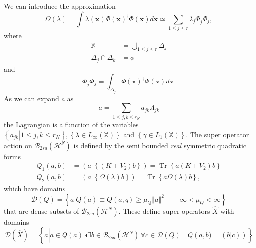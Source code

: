 \documentclass[aps,preprint]{revtex4}%
\begin{document}
We can introduce the approximation
\begin{equation}
\Omega\left(  \lambda\right)  =\int\lambda\left(  \mathbf{x}\right)
\Phi\left(  \mathbf{x}\right)  ^{\dagger}\Phi\left(  \mathbf{x}\right)
d\mathbf{x\simeq}\sum_{1\leq j\leq r}\lambda_{j}\Phi_{j}^{\dagger}\Phi_{j},
\end{equation}
where
\begin{align}
\mathbb{X}  &  \mathbb{=}\bigcup\limits_{1\leq j\leq r}\mathbb{\Delta}_{j}\\
\mathbb{\Delta}_{j}\cap\mathbb{\Delta}_{k}  &  =\phi
\end{align}
and
\begin{equation}
\Phi_{j}^{\dagger}\Phi_{j}=\int_{\mathbb{\Delta}_{j}}\Phi\left(
\mathbf{x}\right)  ^{\dagger}\Phi\left(  \mathbf{x}\right)  d\mathbf{x.}%
\end{equation}
As we can expand $a$ as
\begin{equation}
a=\sum_{1\leq j,k\leq r_{N}}a_{jk}\Lambda_{jk}%
\end{equation}
the Lagrangian is a function of the variables $\left\{  \left.  a_{jk}%
\right\vert 1\leq j,k\leq r_{N}\right\}  ,\left\{  \lambda\in L_{\infty
}\left(  \mathbb{X}\right)  \right\}  $ and $\left\{  \gamma\in L_{1}\left(
\mathbb{X}\right)  \right\}  .$ The super operator action on $\mathcal{B}%
_{2sa}\left(  \mathcal{H}^{N}\right)  $ is defined by the semi bounded
\emph{real }symmetric quadratic forms
\begin{align}
Q_{1}\left(  a,b\right)   &  =\left(  a\left\vert \left\{  \left(
K+V_{2}\right)  b\right\}  \right.  \right)  =\operatorname{Tr}\left\{
a\left(  K+V_{2}\right)  b\right\} \nonumber\\
Q_{2}\left(  a,b\right)   &  =\left(  a\left\vert \left\{  \Omega\left(
\lambda\right)  b\right\}  \right.  \right)  =\operatorname{Tr}\left\{
a\Omega\left(  \lambda\right)  b\right\}  ,
\end{align}
which have domains
\begin{equation}
\mathcal{D}\left(  Q\right)  =\left\{  a\left\vert Q\left(  a\right)  \equiv
Q\left(  a,q\right)  \geq\mu_{Q}\left\Vert a\right\Vert ^{2}\right.
\quad-\infty<\mu_{Q}<\infty\right\}
\end{equation}
that are dense subsets of $\mathcal{B}_{2sa}\left(  \mathcal{H}^{N}\right)  .$
These define super operators $\widehat{X}$ with domains
\begin{equation}
\mathcal{D}\left(  \widehat{X}\right)  =\left\{  a\left\vert \overset{}{a\in
Q\left(  a\right)  \,\backepsilon\exists b\in\mathcal{B}_{2sa}\left(
\mathcal{H}^{N}\right)  \,\forall c\in\mathcal{D}\left(  Q\right)  \quad
Q\left(  a,b)=\left(  \left.  b\right\vert c\right)  \right)  }\right.
\right\}
\end{equation}
\end{document}
